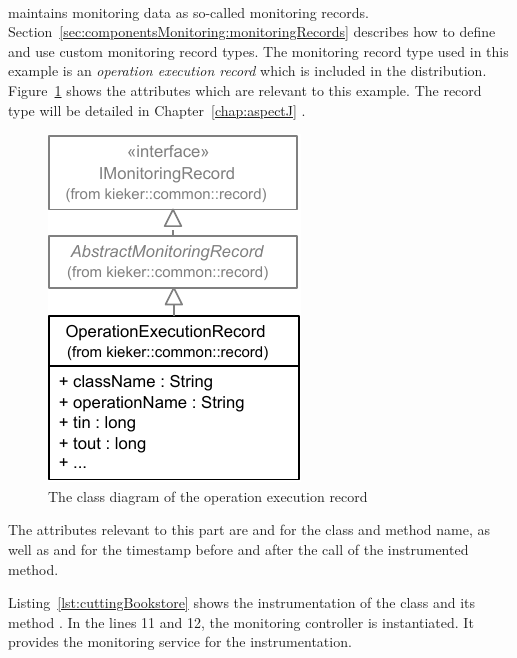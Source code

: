 
\quad\

\noindent \Kieker{} maintains monitoring data as  so-called monitoring records. %
Section~\ref{sec:componentsMonitoring:monitoringRecords} describes how to define and use custom monitoring record types. %
The monitoring record type used in this example is an \textit{operation execution record} which %
is included in the \Kieker{} distribution. %
Figure~\ref{fig:OperationExecutionRecordClassDiagram} shows the %
attributes which  are relevant to this example. %
The record type will be detailed in Chapter~\ref{chap:aspectJ} .

\begin{figure}[H]
\begin{centering}
\includegraphics[scale=1]{images/kieker_OperationExecutionRecord-notraceattributes-inheritance}%
\caption{The class diagram of the operation execution record}
\label{fig:OperationExecutionRecordClassDiagram}
\end{centering}
\end{figure}

\noindent The attributes relevant to this part are  and  %
for the class and method name, as well as  and  for %
the timestamp before and after the call of the instrumented method. 

\enlargethispage{0.7cm}

Listing~\ref{lst:cuttingBookstore} shows the instrumentation of the  class and its method . In the lines 11 and 12, the monitoring controller is instantiated. It provides the monitoring service for the instrumentation.

